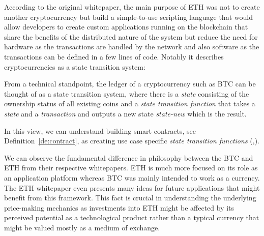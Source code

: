 According to the original whitepaper, the main purpose of \ac{ETH} was not to
create another cryptocurrency but build a simple-to-use scripting language
that would allow developers to create custom applications running on the blockchain 
that share the benefits of the distributed nature of the system but reduce the 
need for hardware as the transactions are handled by the network and also software
as the transactions can be defined in a few lines of code. Notably it 
describes cryptocurrencies as a state transition system:

\begin{defin}\label{de:ledger}
    From a technical standpoint, the ledger of a cryptocurrency such as \ac{BTC}
    can be thought of as a state transition system, where there is a 
    \textit{state}
    consisting of the ownership status of all existing coins and a 
    \textit{state transition function} that takes a \textit{state} and a 
    \textit{transaction}
    and outputs a new state \textit{state-new} which is the result.
\end{defin}

In this view, we can understand building smart contracts, see Definition~\ref{de:contract}, 
as creating use case specific \textit{state transition functions} 
(\citet[see Chapter Bitcoin As A State Transition System]{buterin2013ethereum},\citet[see Chapter 2]{Tikhomirov2018}). 

We can observe the fundamental difference in 
philosophy between the \ac{BTC} and \ac{ETH} from their respective 
whitepapers. \ac{ETH} is much 
more focused on its role as an application platform whereas \ac{BTC} was mainly 
intended to work as a currency. The \ac{ETH} whitepaper even
presents many ideas for future applications that might benefit from this framework.
This fact is crucial in understanding the 
underlying price-making mechanics as investments into \ac{ETH} might be 
affected by its perceived potential as a technological product rather than 
a typical currency that might be valued mostly as a medium of exchange. 


